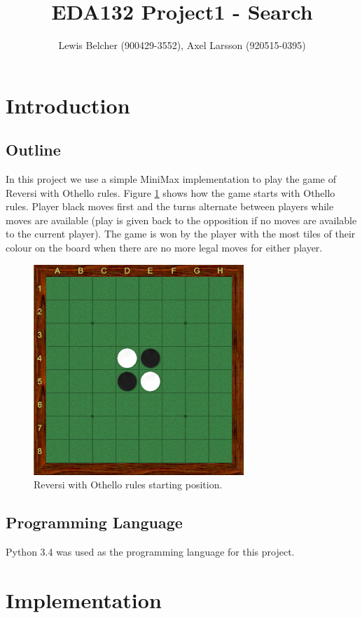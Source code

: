 \documentclass{article}
\title{EDA132 Project1 - Search}
\author{Lewis Belcher (900429-3552), Axel Larsson (920515-0395)}
\date{}
\begin{document}
\maketitle

\section{Introduction}

\subsection{Outline}

In this project we use a simple MiniMax implementation to play the game of Reversi with Othello rules. Figure \ref{fig:othello-start} shows how the game starts with Othello rules. Player black moves first and the turns alternate between players while moves are available (play is given back to the opposition if no moves are available to the current player). The game is won by the player with the most tiles of their colour on the board when there are no more legal moves for either player.

\begin{figure}[h!]
\centering
\includegraphics[scale=0.6]{othello-start.png}
\caption{Reversi with Othello rules starting position.}
\label{fig:othello-start}
\end{figure}

\subsection{Programming Language}

Python 3.4 was used as the programming language for this project.


\section{Implementation}
\end{document}
